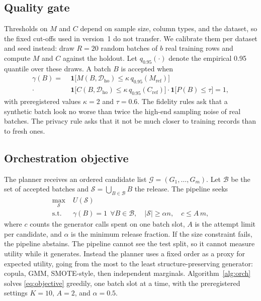 \documentclass[journal]{IEEEtran}
\begin{document}
\subsection{Quality gate}
Thresholds on $M$ and $C$ depend on sample size, column types, and the dataset, so the fixed cut-offs used in version~1 do not transfer. We calibrate them per dataset and seed instead: draw $R=20$ random batches of $b$ real training rows and compute $M$ and $C$ against the holdout. Let $q_{0.95}(\cdot)$ denote the empirical 0.95 quantile over these draws. A batch $B$ is accepted when
\begin{equation}
\begin{split}
\gamma(B)=\;&\mathbf{1}\bigl[M(B,\mathcal{D}_{\mathrm{ho}})\le\kappa\,q_{0.95}(M_{\mathrm{ref}})\bigr]\\
\cdot\;&\mathbf{1}\bigl[C(B,\mathcal{D}_{\mathrm{ho}})\le\kappa\,q_{0.95}(C_{\mathrm{ref}})\bigr]\cdot\mathbf{1}\bigl[P(B)\le\tau\bigr]=1,
\end{split}
\label{eq:gate}
\end{equation}
with preregistered values $\kappa=2$ and $\tau=0.6$. The fidelity rules ask that a synthetic batch look no worse than twice the high-end sampling noise of real batches. The privacy rule asks that it not be much closer to training records than to fresh ones.

\subsection{Orchestration objective}
The planner receives an ordered candidate list $\mathcal{G}=(G_1,\dots,G_m)$. Let $\mathcal{B}$ be the set of accepted batches and $\mathcal{S}=\bigcup_{B\in\mathcal{B}}B$ the release. The pipeline seeks
\begin{equation}
\begin{split}
\max_{\mathcal{S}}\;&U(\mathcal{S})\\
\text{s.t.}\;&\gamma(B)=1\ \ \forall B\in\mathcal{B},\quad |\mathcal{S}|\ge\alpha n,\quad c\le A\,m,
\end{split}
\label{eq:objective}
\end{equation}
where $c$ counts the generator calls spent on one batch slot, $A$ is the attempt limit per candidate, and $\alpha$ is the minimum release fraction. If the size constraint fails, the pipeline abstains. The pipeline cannot see the test split, so it cannot measure utility while it generates. Instead the planner uses a fixed order as a proxy for expected utility, going from the most to the least structure-preserving generator: copula, GMM, SMOTE-style, then independent marginals. Algorithm~\ref{alg:orch} solves \eqref{eq:objective} greedily, one batch slot at a time, with the preregistered settings $K=10$, $A=2$, and $\alpha=0.5$.
\end{document}
